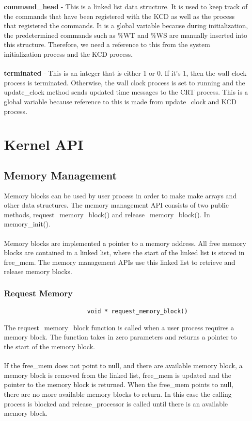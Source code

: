 \documentclass[12pt]{article}
\begin{document}
\textbf{command\_head} - This is a linked list data structure. It is used to keep track of the commands that have been registered with the KCD as well as the process that registered the commands. It is a global variable because during initialization, the predetermined commands such as \%WT and \%WS are manually inserted into this structure. Therefore, we need a reference to this from the system initialization process and the KCD process. \\ \\
\textbf{terminated} - This is an integer that is either 1 or 0. If it’s 1, then the wall clock process is terminated. Otherwise, the wall clock process is set to running and the update\_clock method sends updated time messages to the CRT process. This is a global variable because reference to this is made from update\_clock and KCD process. 
\section{Kernel API}
\subsection{Memory Management}
Memory blocks can be used by user process in order to make make arrays and other data structures. The memory management API consists of two public methods, request\_memory\_block() and release\_memory\_block(). In memory\_init().\\ \\
Memory blocks are implemented a pointer to a memory address. All free memory blocks are contained in a linked list, where the start of the linked list is stored in free\_mem. The memory management APIs use this linked list to retrieve and release memory blocks.
\subsubsection{Request Memory}
\begin{verbatim}
                        void * request_memory_block() 
\end{verbatim}
The request\_memory\_block function is called when a user process requires a memory block. The function takes in zero parameters and returns a pointer to the start of the memory block. \\ \\
If the free\_mem does not point to null, and there are available memory block, a memory block is removed from the linked list, free\_mem is updated and the pointer to the memory block is returned. When the free\_mem points to null, there are no more available memory blocks to return. In this case the calling process is blocked and release\_processor is called until there is an available memory block. 
\end{document}
